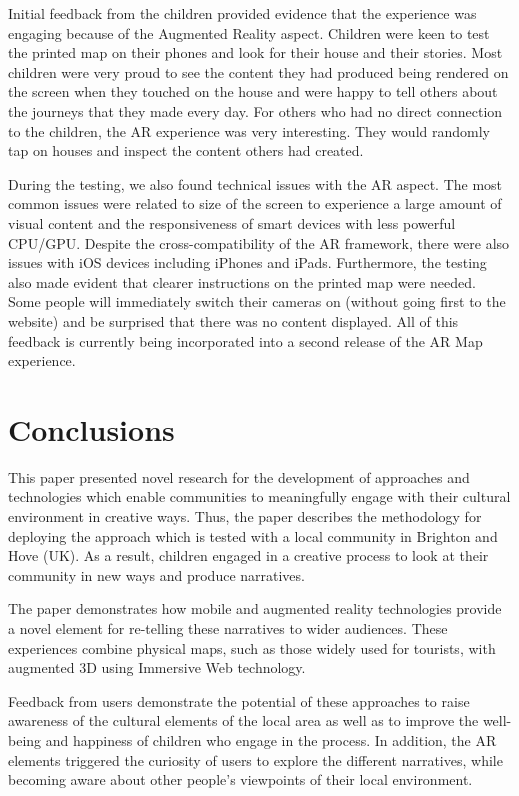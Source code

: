 \documentclass[acmlarge,screen,dvipsnames]{acmart}
\begin{document}
Initial feedback from the children provided evidence that the experience was
engaging because of the Augmented Reality aspect. Children were keen to test
the printed map on their phones and look for their house and their stories.
Most children were very proud to see the content they had produced being
rendered on the screen when they touched on the house and were happy to tell
others about the journeys that they made every day. For others who had no
direct connection to the children, the AR experience was very interesting.
They would randomly tap on houses and inspect the content others had created.
 
 During the testing, we also found technical issues with the AR aspect. The
 most common issues were related to size of the screen to experience a large
 amount of visual content and the responsiveness of smart devices with less
 powerful CPU/GPU. Despite the cross-compatibility of the AR framework, there
 were also issues with iOS devices including iPhones and iPads. Furthermore,
 the testing also made evident that clearer instructions on the printed map
 were needed. Some people will immediately switch their cameras on (without
 going first to the website) and be surprised that there was no content
 displayed.  All of this feedback is currently being incorporated into a
 second release of the AR Map experience. 


\section{Conclusions} \label{conc} This paper presented novel research for the
development of approaches and technologies which enable communities to
meaningfully engage with their cultural environment in creative ways. Thus,
the paper describes the methodology for deploying the approach which is tested
with a local community in Brighton and Hove (UK). As a result, children
engaged in a creative process to look at their community in new ways and
produce narratives.

The paper demonstrates how mobile and augmented reality technologies provide a
novel element for re-telling these narratives to wider audiences. These
experiences combine physical maps, such as those widely used for tourists,
with augmented 3D using Immersive Web technology. 

Feedback from users demonstrate the potential of these approaches to raise
awareness of the cultural elements of the local area as well as to improve the
well-being and happiness of children who engage in the process. In addition,
the AR elements triggered the curiosity of users to explore the different
narratives, while becoming aware about other people's viewpoints of their local
environment.
\end{document}
